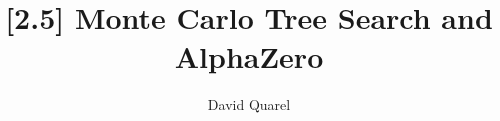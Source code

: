 \providecommand{\HANDOUT}{1}


\newcommand{\green}[1]{\textcolor{green!50!black}{#1}}
\newcommand{\UCB}{\text{UCB}}
\newcommand{\PUCT}{\text{PUCT}}
\newcommand{\nsims}{n_{\text{sim}}}
\newcommand{\pth}{{\boldsymbol{\phi}}}

\newcommand{\cfour}[3][0.3]{%
    \begin{tikzpicture}[scale=#1]
        \fill[cfblue, rounded corners=1pt] (-0.55,-0.55) rectangle (6.55,5.55);
        \foreach \x in {0,...,6} \foreach \y in {0,...,5} \fill[white] (\x,\y) circle (0.38);
        \foreach \x/\y in {#2} \fill[cfred] (\x,\y) circle (0.38);
        \foreach \x/\y in {#3} \fill[cfyellow] (\x,\y) circle (0.38);
    \end{tikzpicture}%
}

\newcommand{\gametree}[6]{%
    \begin{scope}[xshift=#1 cm]
        \node[nd, fill=#2!25, draw=#2] (r) at (0,0) {};
        \foreach \px/\py/\n in {#4} \node[nd, fill=#2!10, draw=#2] (\n) at (\px,\py) {};
        \foreach \u/\v in {#5} \draw[#2, thick] (\u) -- (\v);
        \node[nd, fill=#2!40, draw=#2, thick] at (#6) {};
        \draw[->, #2, thick] ([yshift=-2.5mm]#6) -- (#6 |- 0,-2.5);
        \node[font=\scriptsize, #2] at (0,0.5) {game #3};
    \end{scope}}



\title[{[2.5] MCTS \& AlphaZero}]
{{[2.5] Monte Carlo Tree Search and AlphaZero}}

\author[David Quarel]
{David Quarel}

